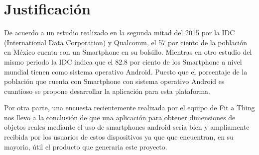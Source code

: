 \section{Justificación}

De acuerdo a un estudio realizado en la segunda mitad del 2015 por la IDC (International Data Corporation) y Qualcomm, el 57 por ciento de la población en México cuenta con un Smartphone en su bolsillo. Mientras en otro estudio del mismo periodo la IDC indica que el 82.8 por ciento de los Smartphone a nivel mundial tienen como sistema operativo Android. Puesto que el porcentaje de la población que cuenta con Smartphone con sistema operativo Android es cuantioso se propone desarrollar la aplicación para esta plataforma.

Por otra parte, una encuesta recientemente realizada por el equipo de Fit a Thing nos llevo a la conclusión de que una aplicación para obtener dimensiones de objetos reales mediante el uso de smartphones android seria bien y ampliamente recibida por los usuarios de estos dispositivos ya que que encuentran, en su mayoria, útil el producto que generaria este proyecto.

